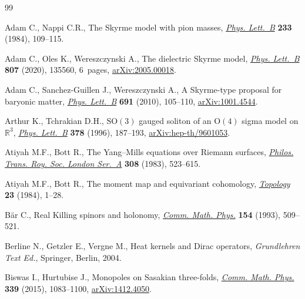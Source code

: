 \documentclass[10pt,a4paper]{amsart}
\newcommand{\1}{{\mathbb{1}}}
\numberwithin{equation}{section}
\begin{document}
\begin{thebibliography}{99}
\footnotesize\itemsep=0pt

Adam C., Nappi C.R., The {S}kyrme model with pion masses, \href{https://doi.org/10.1016/0550-3213(84)90172-X}{\textit{Phys.
 Lett.~B}} \textbf{233} (1984), 109--115.

Adam C., Oles K., Wereszczynski A., The dielectric {S}kyrme model,
 \href{https://doi.org/10.1016/j.physletb.2020.135560}{\textit{Phys. Lett.~B}} \textbf{807} (2020), 135560, 6~pages,
 \href{https://arxiv.org/abs/2005.00018}{arXiv:2005.00018}.

Adam C., Sanchez-Guillen J., Wereszczynski A., A {S}kyrme-type proposal for
 baryonic matter, \href{https://doi.org/10.1016/j.physletb.2010.06.025}{\textit{Phys. Lett.~B}} \textbf{691} (2010), 105--110,
 \href{https://arxiv.org/abs/1001.4544}{arXiv:1001.4544}.

Arthur K., Tchrakian D.H., {$\mathrm{SO}(3)$} gauged soliton of an {$\mathrm{O}(4)$} sigma model
 on {$\mathbb{R}^3$}, \href{https://doi.org/10.1016/0370-2693(96)00343-7}{\textit{Phys. Lett.~B}} \textbf{378} (1996), 187--193,
 \href{https://arxiv.org/abs/hep-th/9601053}{arXiv:hep-th/9601053}.

Atiyah M.F., Bott R., The {Y}ang--{M}ills equations over {R}iemann surfaces,
 \href{https://doi.org/10.1098/rsta.1983.0017}{\textit{Philos. Trans. Roy. Soc. London Ser.~A}} \textbf{308} (1983),
 523--615.

Atiyah M.F., Bott R., The moment map and equivariant cohomology,
 \href{https://doi.org/10.1016/0040-9383(84)90021-1}{\textit{Topology}} \textbf{23} (1984), 1--28.

B\"ar C., Real {K}illing spinors and holonomy, \href{https://doi.org/10.1007/BF02102106}{\textit{Comm. Math. Phys.}}
 \textbf{154} (1993), 509--521.

Berline N., Getzler E., Vergne M., Heat kernels and {D}irac operators,
 \textit{Grundlehren Text Ed.}, Springer, Berlin, 2004.

Biswas I., Hurtubise J., Monopoles on {S}asakian three-folds, \href{https://doi.org/10.1007/s00220-015-2444-3}{\textit{Comm.
 Math. Phys.}} \textbf{339} (2015), 1083--1100, \href{https://arxiv.org/abs/1412.4050}{arXiv:1412.4050}.


\end{thebibliography}
\end{document}
